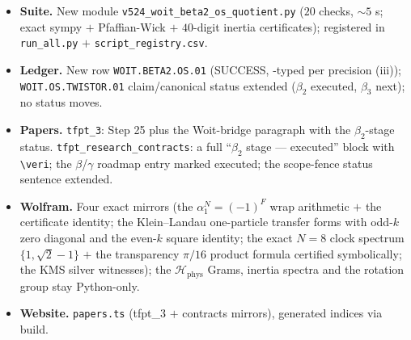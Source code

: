 \documentclass[11pt]{article}
\begin{document}
\begin{itemize}[leftmargin=1.5em]
\item \textbf{Suite.} New module \texttt{v524\_woit\_beta2\_os\_quotient.py} ($20$ checks, $\sim5$ s;
exact sympy $+$ Pfaffian-Wick $+$ $40$-digit inertia certificates); registered in
\texttt{run\_all.py} $+$ \texttt{script\_registry.csv}.
\item \textbf{Ledger.} New row \texttt{WOIT.BETA2.OS.01} (SUCCESS, \mC-typed per precision
(iii)); \texttt{WOIT.OS.TWISTOR.01} claim/canonical status extended ($\beta_2$ executed,
$\beta_3$ next); no status moves.
\item \textbf{Papers.} \texttt{tfpt\_3}: Step 25 plus the Woit-bridge paragraph with the
$\beta_2$-stage status. \texttt{tfpt\_research\_contracts}: a full ``$\beta_2$ stage ---
executed'' block with \texttt{\textbackslash veri}; the $\beta$/$\gamma$ roadmap entry marked
executed; the scope-fence status sentence extended.
\item \textbf{Wolfram.} Four exact mirrors (the $\alpha_1^N=(-1)^F$ wrap arithmetic $+$ the
certificate identity; the Klein--Landau one-particle transfer forms with odd-$k$ zero diagonal
and the even-$k$ square identity; the exact $N=8$ clock spectrum $\{1,\sqrt2-1\}$ $+$ the
transparency $\pi/16$ product formula certified symbolically; the KMS silver witnesses); the
$\mathcal H_{\mathrm{phys}}$ Grams, inertia spectra and the rotation group stay Python-only.
\item \textbf{Website.} \texttt{papers.ts} (tfpt\_3 $+$ contracts mirrors), generated indices
via build.
\end{itemize}
\end{document}
